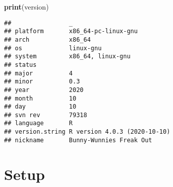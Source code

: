 \documentclass[]{book}
\newenvironment{Shaded}{\begin{snugshade}}{\end{snugshade}}
\newcommand{\KeywordTok}[1]{\textcolor[rgb]{0.13,0.29,0.53}{\textbf{#1}}}
\newcommand{\NormalTok}[1]{#1}
\begin{document}
\begin{Shaded}
\begin{Highlighting}[]
\KeywordTok{print}\NormalTok{(version)}
\end{Highlighting}
\end{Shaded}

\begin{verbatim}
##                _                           
## platform       x86_64-pc-linux-gnu         
## arch           x86_64                      
## os             linux-gnu                   
## system         x86_64, linux-gnu           
## status                                     
## major          4                           
## minor          0.3                         
## year           2020                        
## month          10                          
## day            10                          
## svn rev        79318                       
## language       R                           
## version.string R version 4.0.3 (2020-10-10)
## nickname       Bunny-Wunnies Freak Out
\end{verbatim}

\hypertarget{setup}{%
\section{Setup}\label{setup}}
\end{document}
